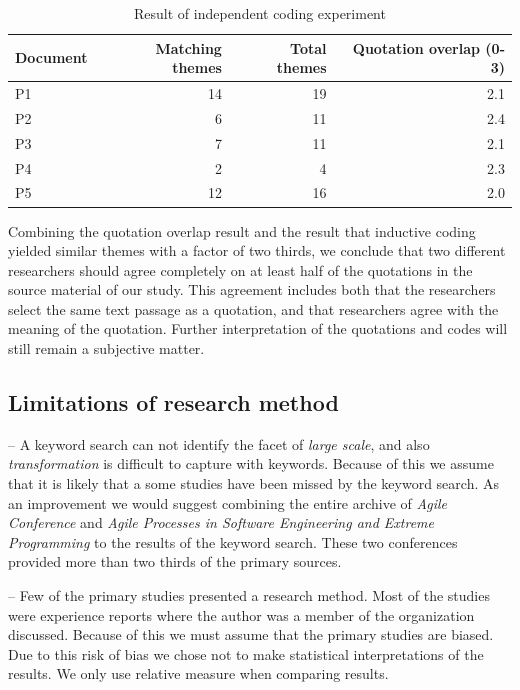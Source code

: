 \documentclass[preprint,authoryear,12pt]{elsarticle}
\begin{document}
\begin{table}
    \centering
    \begin{tabular}{ l r r r }
        \toprule
        Document    &  Matching themes  &  Total themes  &  Quotation overlap (0-3) \\
        \midrule
        P1          &  14  &  19   &  2.1  \\
        P2          &   6  &  11   &  2.4  \\
        P3          &   7  &  11   &  2.1  \\
        P4          &   2  &   4   &  2.3  \\
        P5          &  12  &  16   &  2.0  \\
        \bottomrule
    \end{tabular}
    \caption{Result of independent coding experiment}
    \label{table:codingexperiment}
\end{table}

Combining the quotation overlap result and the result that inductive coding
yielded similar themes with a factor of two thirds, we conclude that two
different researchers should agree completely on at least half of the quotations
in the source material of our study. This agreement includes both that the
researchers select the same text passage as a quotation, and that researchers
agree with the meaning of the quotation. Further interpretation of the
quotations and codes will still remain a subjective matter.


\subsection{Limitations of research method}

-- A keyword search can not identify the facet of \emph{large scale}, and also
   \emph{transformation} is difficult to capture with keywords. Because of this
   we assume that it is likely that a some studies have been missed by the
   keyword search. As an improvement we would suggest combining the entire
   archive of \emph{Agile Conference} and \emph{Agile Processes in Software
   Engineering and Extreme Programming} to the results of the keyword search.
   These two conferences provided more than two thirds of the primary sources.

-- Few of the primary studies presented a research method. Most of the studies
   were experience reports where the author was a member of the organization
   discussed. Because of this we must assume that the primary studies are
   biased. Due to this risk of bias we chose not to make statistical
   interpretations of the results. We only use relative measure when comparing
   results.
\end{document}
